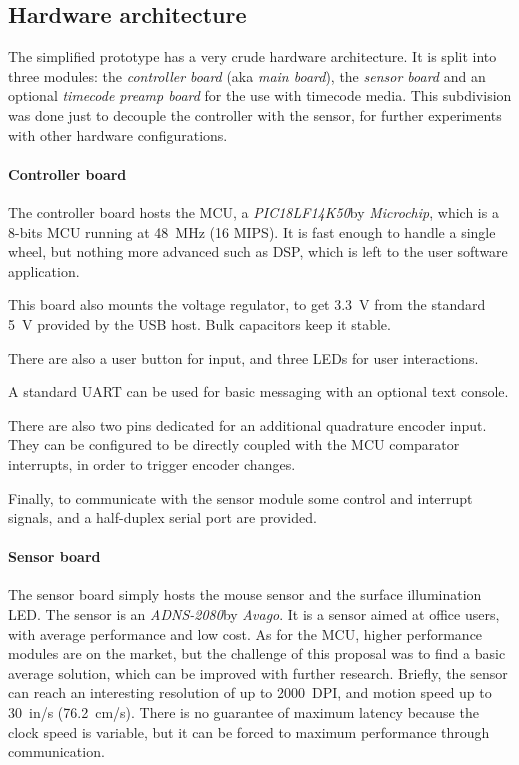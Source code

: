 \documentclass[a4paper,10pt]{article}
\begin{document}
\begin{multicols}{2}
\subsection{Hardware architecture}

The simplified prototype has a very crude hardware architecture. It is split
into three modules: the \emph{controller board} (aka \emph{main board}), the
\emph{sensor board} and an optional \emph{timecode preamp board} for the use
with timecode media. This subdivision was done just to decouple the controller
with the sensor, for further experiments with other hardware configurations.


\paragraph{Controller board}
The controller board hosts the MCU, a \emph{PIC18LF14K50}\CITEME by
\emph{Microchip}, which is a 8-bits MCU running at 48~MHz (16 MIPS).
It is fast enough to handle a single wheel, but nothing more advanced such as
DSP, which is left to the user software application.

This board also mounts the voltage regulator, to get 3.3~V from the standard
5~V provided by the USB host. Bulk capacitors keep it stable.

There are also a user button for input, and three LEDs for user interactions.

A standard UART can be used for basic messaging with an optional text console.

There are also two pins dedicated for an additional quadrature encoder input.
They can be configured to be directly coupled with the MCU comparator
interrupts, in order to trigger encoder changes.

Finally, to communicate with the sensor module some control and interrupt
signals, and a half-duplex serial port are provided.

\INSFIG


\paragraph{Sensor board}
The sensor board simply hosts the mouse sensor and the surface illumination
LED. The sensor is an \emph{ADNS-2080}\CITEME by \emph{Avago}. It is a sensor
aimed at office users, with average performance and low cost. As for the MCU,
higher performance modules are on the market, but the challenge of this
proposal was to find a basic average solution, which can be improved with
further research. Briefly, the sensor can reach an interesting resolution of
up to 2000~DPI, and motion speed up to 30~in/s (76.2~cm/s). There is no
guarantee of maximum latency because the clock speed is variable, but it can
be forced to maximum performance through communication.


\end{multicols}
\end{document}
